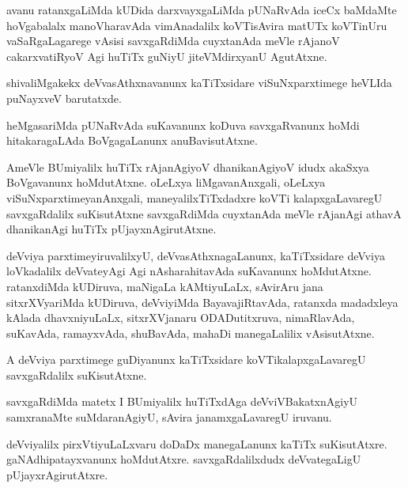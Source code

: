 \documentclass{article}
\begin{document}
\begin{mng}%
avanu ratanxgaLiMda kUDida darxvayxgaLiMda pUNaRvAda iceCx baMdaMte 
hoVgabalalx manoVharavAda vimAnadalilx koVTisAvira matUTx koVTinUru 
vaSaRgaLagarege vAsisi savxgaRdiMda cuyxtanAda meVle rAjanoV 
cakarxvatiRyoV Agi huTiTx guNiyU jiteVMdirxyanU AgutAtxne.
\end{mng}

\begin{mng}%
shivaliMgakekx deVvasAthxnavanunx kaTiTxsidare viSuNxparxtimege 
heVLIda puNayxveV barutatxde.
\end{mng}

\begin{mng}%
heMgasariMda pUNaRvAda suKavanunx koDuva savxgaRvanunx hoMdi 
hitakaragaLAda BoVgagaLanunx anuBavisutAtxne.
\end{mng}

\begin{mng}%
AmeVle BUmiyalilx huTiTx rAjanAgiyoV dhanikanAgiyoV idudx akaSxya 
BoVgavanunx hoMdutAtxne. oLeLxya liMgavanAnxgali, oLeLxya 
viSuNxparxtimeyanAnxgali, maneyalilxTiTxdadxre koVTi kalapxgaLavaregU 
savxgaRdalilx suKisutAtxne savxgaRdiMda cuyxtanAda meVle rAjanAgi 
athavA dhanikanAgi huTiTx pUjayxnAgirutAtxne.
\end{mng}

\begin{mng}%
deVviya parxtimeyiruvalilxyU, deVvasAthxnagaLanunx, kaTiTxsidare 
deVviya loVkadalilx deVvateyAgi Agi nAsharahitavAda suKavanunx 
hoMdutAtxne. ratanxdiMda kUDiruva, maNigaLa kAMtiyuLaLx, sAvirAru jana 
sitxrXVyariMda kUDiruva, deVviyiMda BayavajiRtavAda, ratanxda 
madadxleya kAlada dhavxniyuLaLx, sitxrXVjanaru ODADutitxruva, 
nimaRlavAda, suKavAda, ramayxvAda, shuBavAda, mahaDi manegaLalilix 
vAsisutAtxne.
\end{mng}

\begin{mng}%
A deVviya parxtimege guDiyanunx kaTiTxsidare koVTikalapxgaLavaregU 
savxgaRdalilx suKisutAtxne.
\end{mng}


\begin{mng}%
savxgaRdiMda matetx I BUmiyalilx huTiTxdAga deVviVBakatxnAgiyU 
samxranaMte suMdaranAgiyU, sAvira janamxgaLavaregU iruvanu.
\end{mng}

\begin{mng}%
deVviyalilx pirxVtiyuLaLxvaru doDaDx manegaLanunx kaTiTx suKisutAtxre. 
gaNAdhipatayxvanunx hoMdutAtxre. savxgaRdalilxdudx deVvategaLigU 
pUjayxrAgirutAtxre.
\end{mng}
\end{document}
